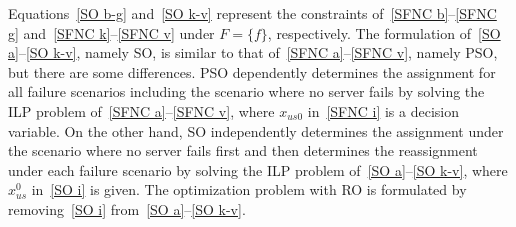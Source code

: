 \documentclass[10pt, letterpaper]{IEEEtran}
\newcommand\red[1]{\textcolor{red}{#1}}
\begin{document}
\begin{CJK}{UTF8}{ipxm}
  Equations~\eqref{SO b-g} and~\eqref{SO k-v} represent the constraints of~\eqref{SFNC b}--\eqref{SFNC g} and~\eqref{SFNC k}--\eqref{SFNC v} under $F = \{f\}$, respectively.
  The formulation of~\eqref{SO a}--\eqref{SO k-v}, namely SO, is similar to that of~\eqref{SFNC a}--\eqref{SFNC v}, namely PSO, but there are some differences.
  PSO dependently determines the assignment for all failure scenarios including the scenario where no server fails by solving the ILP problem of~\eqref{SFNC a}--\eqref{SFNC v}, where $x_{us0}$ in~\eqref{SFNC i} is a decision variable.
  On the other hand, SO independently determines the assignment under the scenario where no server fails first and then determines the reassignment under each failure scenario by solving the ILP problem of~\eqref{SO a}--\eqref{SO k-v}, where $x^0_{us}$ in~\eqref{SO i} is given.
  The optimization problem with RO is formulated by removing~\eqref{SO i} from~\eqref{SO a}--\eqref{SO k-v}.


\end{CJK}
\end{document}
